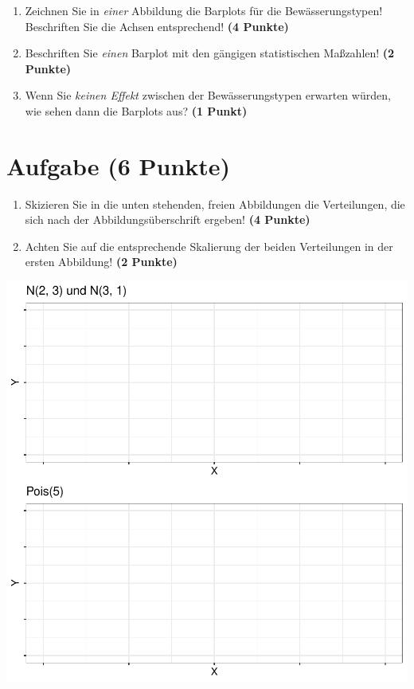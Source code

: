 \documentclass[a4paper, 10pt]{scrartcl}\usepackage[]{graphicx}\usepackage[]{xcolor}
\makeatletter
\def\maxwidth{ %
  \ifdim\Gin@nat@width>\linewidth
    \linewidth
  \else
    \Gin@nat@width
  \fi
}
\makeatother
\begin{document}
\begin{enumerate}
\item Zeichnen Sie in \textit{einer} Abbildung die Barplots f{\"u}r die
  Bew{\"a}sserungstypen! Beschriften Sie die Achsen entsprechend!  \textbf{(4
    Punkte)}
\item Beschriften Sie \textit{einen} Barplot mit den g{\"a}ngigen
  statistischen Ma{\ss}zahlen! \textbf{(2 Punkte)}
\item Wenn Sie \textit{keinen Effekt} zwischen der Bew{\"a}sserungstypen
  erwarten w{\"u}rden, wie sehen dann die Barplots aus? \textbf{(1 Punkt)}
\end{enumerate} 
\clearpage

\section{Aufgabe \hfill (6 Punkte)}



\begin{enumerate}
\item Skizieren Sie in die unten stehenden, freien Abbildungen die
  Verteilungen, die sich nach der Abbildungs{\"u}berschrift ergeben! \textbf{(4
    Punkte)}
\item Achten Sie auf die entsprechende Skalierung der beiden Verteilungen
  in der ersten Abbildung! \textbf{(2 Punkte)}
\end{enumerate}



{\centering \includegraphics[width=\maxwidth]{img/histogram-01-1} 

}
\end{document}
